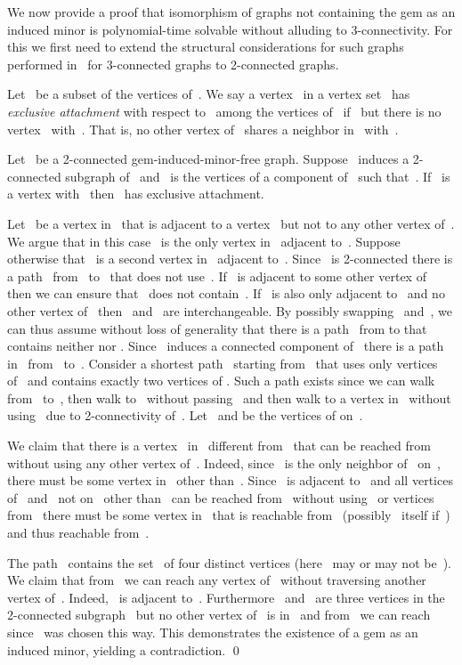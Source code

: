 \documentclass[envcountsame,envcountsect,11pt,a4paper]{llncs}
\renewenvironment{proof}{\begin{Proof}}{\qed\end{Proof}}
\begin{document}
We now provide a proof that isomorphism of graphs not containing the gem as an induced minor is polynomial-time solvable without alluding to 3-connectivity. For this we first need to extend the structural considerations for such graphs performed in~\cite{Ponomarenko88} for 3-connected graphs to 2-connected graphs.

Let~ be a subset of the vertices of~.
We say a vertex~ in a vertex set~ has \emph{exclusive attachment} with respect to~ among the vertices of~ if~ but there is no vertex~ with~. That is, no other vertex of~ shares a neighbor in~ with~.

\begin{lemma}
\label{only:one:neighbor:implies:exclusive:attachment}
Let~ be a 2-connected gem-induced-minor-free graph.
Suppose~ induces a 2-connected subgraph of~ and~ is the vertices of a component
of~ such that~.
If~ is a vertex with~ then~ has exclusive attachment.
\end{lemma}
\begin{proof}
Let~ be a vertex in~ that is adjacent to a vertex~ but not to any other vertex of~. We argue that in this case~ is the
only vertex in~ adjacent to~. Suppose otherwise that~ is a second vertex in~ adjacent to~.
Since~ is 2-connected there is a path~ from~ to~ that does not use~.
If~ is adjacent to some other vertex of~ then we can ensure that~ does not contain~.
If~ is also only adjacent to~ and no other vertex of~ then~ and~ are interchangeable.
By possibly swapping~ and~, we can thus assume without loss of generality that
there is a path~ from  to  that contains neither  nor .
Since~ induces a connected component of~ there is a path~ in~ from~ to~.
Consider a shortest path~ starting from~ that uses only vertices of~ and contains exactly two vertices of .
Such a path exists since we can walk from~ to~, then walk to~ without passing~ and then walk to a vertex
in~ without using~ due to 2-connectivity of~.
Let~ and  be the vertices of  on~.
 
We claim that there is a vertex~ in~ different from~ that can be reached from~ without using any other
vertex of~. Indeed, since~ is the only neighbor of~ on~, there must be some vertex in~
other than~. Since~ is adjacent to~ and all vertices of~ and~ not on~ other than~ can be reached from~ without
using~ or vertices from~ there must be some vertex in~ that is reachable from~ (possibly~ itself
if~) and thus reachable from~.

The path~ contains the set~ of four distinct vertices (here~ may or may not be~). We claim that
from~ we can reach any vertex of~ without traversing another vertex of~. Indeed,~ is adjacent
to~. Furthermore~ and~ are three vertices in the 2-connected subgraph~ but no other vertex of~ is in~ and
from~ we can reach~ since~ was chosen this way. This demonstrates the existence of a gem as an induced minor, yielding a
contradiction.
\end{proof}
\end{document}
